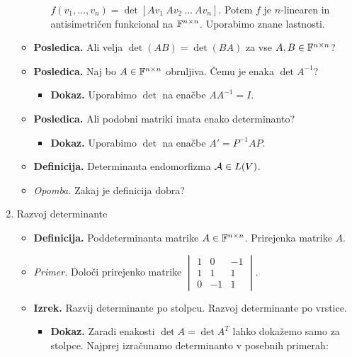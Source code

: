 \begin{enumerate}
\begin{itemize}
\begin{itemize}
            $f(v_1, \ldots, v_n) = \det [Av_1 \ Av_2 \ \ldots \ Av_n]$. Potem $f$ je $n$-linearen in antisimetričen funkcional na $\mathbb{F}^{n \times n}$. Uporabimo znane lastnosti.
        \end{itemize}
        \item \colorbox{orange!30}{\textbf{Posledica.}} Ali velja $\det(AB) = \det(BA)$ za vse $A, B \in \mathbb{F}^{n \times n}$?
        \item \colorbox{orange!30}{\textbf{Posledica.}} Naj bo $A \in \mathbb{F}^{n \times n}$ obrnljiva. Čemu je enaka $\det A^{-1}$?
        \begin{itemize}
            \item \colorbox{green!30}{\textbf{Dokaz.}} Uporabimo $\det$ na enačbe $AA^{-1} = I$.
        \end{itemize}
        \item \colorbox{orange!30}{\textbf{Posledica.}} Ali podobni matriki imata enako determinanto?
        \begin{itemize}
            \item \colorbox{green!30}{\textbf{Dokaz.}} Uporabimo $\det$ na enačbe $A' = P^{-1}AP$.
        \end{itemize}
        \item \colorbox{purple!30}{\textbf{Definicija.}} Determinanta endomorfizma $\mathcal{A} \in L(V)$.
        \item \colorbox{yellow!30}{\emph{Opomba.}} Zakaj je definicija dobra?
    \end{itemize}
    \item Razvoj determinante
    \begin{itemize}
        \item \colorbox{purple!30}{\textbf{Definicija.}} Poddeterminanta matrike $A \in \mathbb{F}^{n \times n}$. Prirejenka matrike $A$.
        \item \colorbox{yellow!30}{\emph{Primer.}} Določi prirejenko matrike $\begin{vmatrix}
            1 & 0 & -1 \\
            1 & 1 & 1 \\
            0 & -1 & 1
        \end{vmatrix}$.
        \item \colorbox{blue!30}{\textbf{Izrek.}} Razvij determinante po stolpcu. Razvoj determinante po vrstice.
        \begin{itemize}
            \item \colorbox{green!30}{\textbf{Dokaz.}} Zaradi enakosti $\det A = \det A^T$ lahko dokažemo samo za stolpce. Najprej izračunamo determinanto v posebnih primerah:
            

\end{itemize}
\end{itemize}
\end{enumerate}
